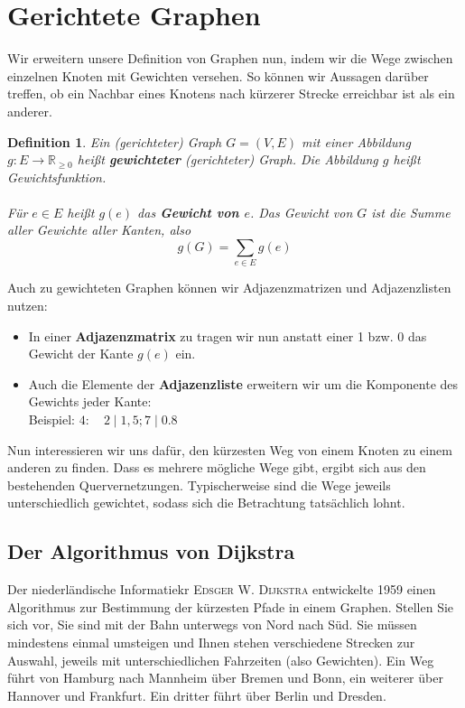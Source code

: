 \documentclass[11pt,a4paper]{scrartcl}
\newtheorem{definition}{Definition}
\begin{document}
\section{Gerichtete Graphen}
Wir erweitern unsere Definition von Graphen nun, indem wir die Wege zwischen einzelnen Knoten mit Gewichten versehen. So können wir Aussagen darüber treffen, ob ein Nachbar eines Knotens nach kürzerer Strecke erreichbar ist als ein anderer.
\begin{definition}
Ein (gerichteter) Graph $G = (V, E)$ mit einer Abbildung $g: E \to \mathbb{R}_{\geq 0}$ heißt \textbf{gewichteter} (gerichteter) Graph. Die Abbildung $g$ heißt Gewichtsfunktion. \\\\
Für $e \in E$ heißt $g(e)$ das \textbf{Gewicht von $e$}. Das Gewicht von $G$ ist die Summe aller Gewichte aller Kanten, also 
\[g(G) = \sum_{e \in E} g(e)\]
\end{definition}
Auch zu gewichteten Graphen können wir Adjazenzmatrizen und Adjazenzlisten nutzen:
\begin{itemize}
\item In einer \textbf{Adjazenzmatrix} zu tragen wir nun anstatt einer 1 bzw. 0 das Gewicht der Kante $g(e)$ ein.
\item Auch die Elemente der \textbf{Adjazenzliste} erweitern wir um die Komponente des Gewichts jeder Kante: \\
Beispiel: $4: \quad 2 \mid 1,5; 7 \mid 0.8$
\end{itemize}
Nun interessieren wir uns dafür, den kürzesten Weg von einem Knoten zu einem anderen zu finden. Dass es mehrere mögliche Wege gibt, ergibt sich aus den bestehenden Quervernetzungen. Typischerweise sind die Wege jeweils unterschiedlich gewichtet, sodass sich die Betrachtung tatsächlich lohnt. 
\subsection{Der Algorithmus von Dijkstra}
Der niederländische Informatiekr \textsc{Edsger W. Dijkstra} entwickelte 1959 einen Algorithmus zur Bestimmung der kürzesten Pfade in einem Graphen. Stellen Sie sich vor, Sie sind mit der Bahn unterwegs von Nord nach Süd. Sie müssen mindestens einmal umsteigen und Ihnen stehen verschiedene Strecken zur Auswahl, jeweils mit unterschiedlichen Fahrzeiten (also Gewichten). Ein Weg führt von Hamburg nach Mannheim über Bremen und Bonn, ein weiterer über Hannover und Frankfurt. Ein dritter führt über Berlin und Dresden.
\end{document}
